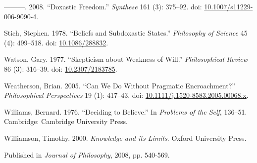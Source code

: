 \documentclass[
  11pt,
  letterpaper,
  DIV=11,
  numbers=noendperiod,
  twoside]{scrartcl}
\newlength{\cslhangindent}
\newenvironment{CSLReferences}[2] %
 {\begin{list}{}{%
  \setlength{\itemindent}{0pt}
  \setlength{\leftmargin}{0pt}
  \setlength{\parsep}{0pt}
  \ifodd #1
   \setlength{\leftmargin}{\cslhangindent}
   \setlength{\itemindent}{-1\cslhangindent}
  \fi
  \setlength{\itemsep}{#2\baselineskip}}}
 {\end{list}}
\begin{document}
\begin{CSLReferences}{1}{0}
---------. 2008. {``Doxastic Freedom.''} \emph{Synthese} 161 (3):
375--92. doi:
\href{https://doi.org/10.1007/s11229-006-9090-4}{10.1007/s11229-006-9090-4}.

Stich, Stephen. 1978. {``Beliefs and Subdoxastic States.''}
\emph{Philosophy of Science} 45 (4): 499--518. doi:
\href{https://doi.org/10.1086/288832}{10.1086/288832}.

Watson, Gary. 1977. {``Skepticism about Weakness of Will.''}
\emph{Philosophical Review} 86 (3): 316--39. doi:
\href{https://doi.org/10.2307/2183785}{10.2307/2183785}.

Weatherson, Brian. 2005. {``{Can We Do Without Pragmatic
Encroachment?}''} \emph{Philosophical Perspectives} 19 (1): 417--43.
doi:
\href{https://doi.org/10.1111/j.1520-8583.2005.00068.x}{10.1111/j.1520-8583.2005.00068.x}.

Williams, Bernard. 1976. {``Deciding to Believe.''} In \emph{Problems of
the Self}, 136--51. Cambridge: Cambridge University Press.

Williamson, Timothy. 2000. \emph{{Knowledge and its Limits}}. Oxford
University Press.

\end{CSLReferences}



\noindent Published in\emph{
Journal of Philosophy}, 2008, pp. 540-569.
\end{document}
